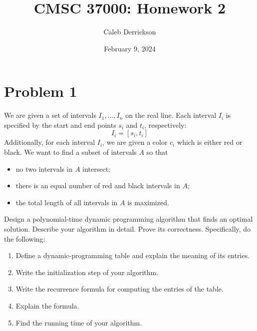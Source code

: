

\title{CMSC 37000: Homework 2}
\author{Caleb Derrickson}
\date{February 9, 2024}

\usetikzlibrary{positioning, arrows.meta, bending}


\onehalfspacing
\maketitle
\allowdisplaybreaks


\tableofcontents

\newpage
\section{Problem 1}
We are given a set of intervals $I_1, ..., I_n$ on the real line. Each interval $I_i$ is specified by the start and end points $s_i$ and $t_i$, respectively:
\[I_i = [s_i, t_i]\]
Additionally, for each interval $I_i$, we are given a color $c_i$ which is either red or black. We want to find a subset of intervals $A$ so that 
\begin{itemize}[$\bullet$]
    \item no two intervals in $A$ intersect;
    \item there is an equal number of red and black intervals in $A$;
    \item the total length of all intervals in $A$ is maximized.
\end{itemize}
Design a polynomial-time dynamic programming algorithm that finds an optimal solution. Describe your algorithm in detail. Prove its correctness. Specifically, do the following:
\begin{enumerate}
    \item Define a dynamic-programming table and explain the meaning of its entries.
    \item Write the initialization step of your algorithm.
    \item Write the recurrence formula for computing the entries of the table.
    \item Explain the formula.
    \item Find the running time of your algorithm.
\end{enumerate}
\partbreak
